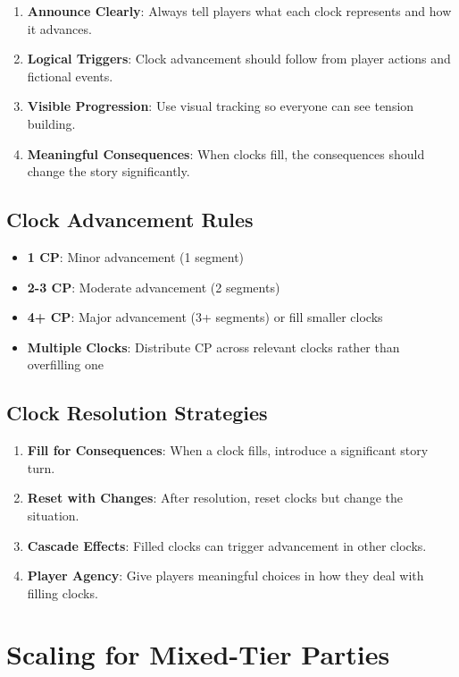 \begin{enumerate}
\item \textbf{Announce Clearly}: Always tell players what each clock represents and how it advances.
\item \textbf{Logical Triggers}: Clock advancement should follow from player actions and fictional events.
\item \textbf{Visible Progression}: Use visual tracking so everyone can see tension building.
\item \textbf{Meaningful Consequences}: When clocks fill, the consequences should change the story significantly.
\end{enumerate}

\subsection*{Clock Advancement Rules}

\begin{itemize}
\item \textbf{1 CP}: Minor advancement (1 segment)
\item \textbf{2-3 CP}: Moderate advancement (2 segments)  
\item \textbf{4+ CP}: Major advancement (3+ segments) or fill smaller clocks
\item \textbf{Multiple Clocks}: Distribute CP across relevant clocks rather than overfilling one
\end{itemize}

\subsection*{Clock Resolution Strategies}

\begin{enumerate}
\item \textbf{Fill for Consequences}: When a clock fills, introduce a significant story turn.
\item \textbf{Reset with Changes}: After resolution, reset clocks but change the situation.
\item \textbf{Cascade Effects}: Filled clocks can trigger advancement in other clocks.
\item \textbf{Player Agency}: Give players meaningful choices in how they deal with filling clocks.
\end{enumerate}

\section*{Scaling for Mixed-Tier Parties}

